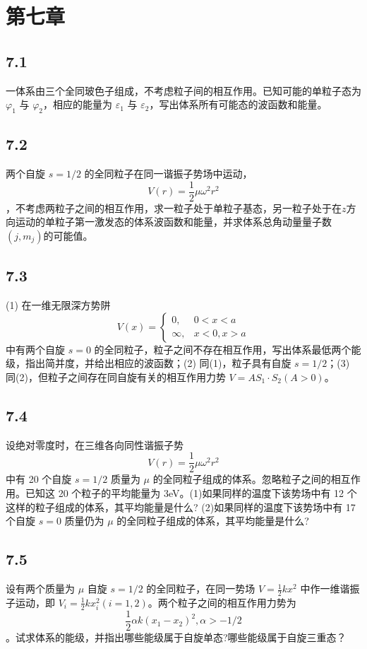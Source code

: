 \section{第七章}

\subsection{7.1}
一体系由三个全同玻色子组成，不考虑粒子间的相互作用。已知可能的单粒子态为 $\varphi_1$ 与 $\varphi_2$，相应的能量为 $\varepsilon_1$ 与 $\varepsilon_2$，写出体系所有可能态的波函数和能量。

\subsection{7.2}
两个自旋 $s = 1/2$ 的全同粒子在同一谐振子势场中运动，$$V(r) = \frac{1}{2} \mu \omega^2 r^2$$，不考虑两粒子之间的相互作用，求一粒子处于单粒子基态，另一粒子处于在$z$方向运动的单粒子第一激发态的体系波函数和能量，并求体系总角动量量子数$(j,m_j)$的可能值。

\subsection{7.3}
(1) 在一维无限深方势阱 $$V(x) = \begin{cases} 0, & 0 < x < a \\ \infty, & x < 0, x > a \end{cases}$$ 中有两个自旋 $s = 0$ 的全同粒子，粒子之间不存在相互作用，写出体系最低两个能级，指出简并度，并给出相应的波函数；(2) 同(1)，粒子具有自旋 $s = 1/2$；(3) 同(2)，但粒子之间存在同自旋有关的相互作用力势 $V = A S_1 \cdot S_2 (A>0)$。

\subsection{7.4}
设绝对零度时，在三维各向同性谐振子势 $$V(r) = \frac{1}{2}\mu\omega^2r^2$$ 中有 20 个自旋 $s=1/2$ 质量为 $\mu$ 的全同粒子组成的体系。忽略粒子之间的相互作用。已知这 20 个粒子的平均能量为 3eV。(1)如果同样的温度下该势场中有 12 个这样的粒子组成的体系，其平均能量是什么? (2)如果同样的温度下该势场中有 17 个自旋 $s=0$ 质量仍为 $\mu$ 的全同粒子组成的体系，其平均能量是什么?

\subsection{7.5}
设有两个质量为 $\mu$ 自旋 $s=1/2$ 的全同粒子，在同一势场 $V=\frac{1}{2}kx^2$ 中作一维谐振子运动，即 $V_i=\frac{1}{2}kx_i^2(i=1,2)$。两个粒子之间的相互作用力势为 $$\frac{1}{2}\alpha k(x_1-x_2)^2,\alpha>-1/2$$。试求体系的能级，并指出哪些能级属于自旋单态?哪些能级属于自旋三重态？

